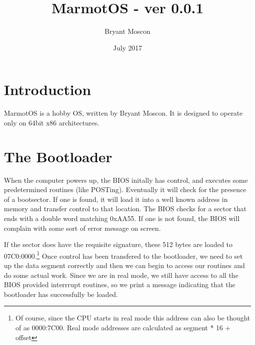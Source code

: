 \documentclass[a4paper,12pt]{article}
\begin{document}
\title{MarmotOS - ver 0.0.1}
\author{Bryant Moscon}
\date{July 2017}
\maketitle
\thispagestyle{fancy}
\noindent\hrulefill
\vspace{-5mm} %
\tableofcontents
\noindent\hrulefill

\clearpage

\section{Introduction}

MarmotOS is a hobby OS, written by Bryant Moscon. It is designed to operate only on 64bit x86 architectures. 


\section{The Bootloader}

When the computer powers up, the BIOS initally has control, and executes some predetermined routines (like POSTing). Eventually it will check for the presence of a bootsector. If one is found, it will load it into a well known address in memory and transfer control to that location. The BIOS checks for a sector that ends with a double word matching 0xAA55. If one is not found, the BIOS will complain with some sort of error message on screen.

If the sector does have the requisite signature, these 512 bytes are loaded to 07C0:0000.\footnote{Of course, since the CPU starts in real mode this address can also be thought of as 0000:7C00. Real mode addresses are calculated as segment * 16 + offset} Once control has been transfered to the bootloader, we need to set up the data segment correctly and then we can begin to access our routines and do some actual work. Since we are in real mode, we still have access to all the BIOS provided interrrupt routines, so we print a message indicating that the bootloader has successfully be loaded. 
\end{document}
